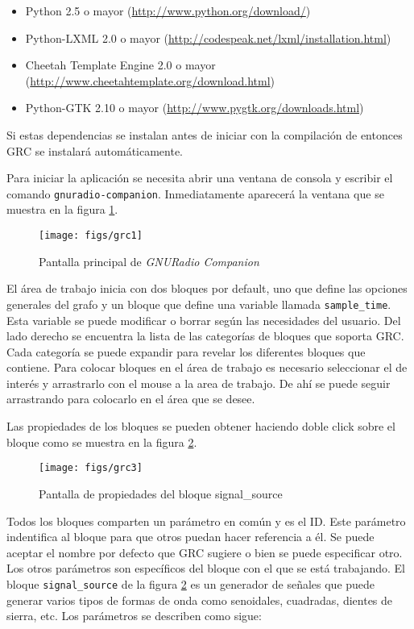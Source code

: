\begin{itemize}
  \item Python 2.5 o mayor (\url{http://www.python.org/download/})
  \item Python-LXML 2.0 o  mayor (\url{http://codespeak.net/lxml/installation.html})
  \item Cheetah Template Engine 2.0 o mayor (\url{http://www.cheetahtemplate.org/download.html})
  \item Python-GTK 2.10 o mayor (\url{http://www.pygtk.org/downloads.html})
\end{itemize}

Si estas dependencias se instalan antes de iniciar con la compilaci\'on de \gnuradio entonces GRC se
instalar\'a autom\'aticamente.

Para iniciar la aplicaci\'on se necesita abrir una ventana de consola y escribir el comando
\verb|gnuradio-companion|. Inmediatamente aparecer\'a la ventana que se muestra en la figura
\ref{fig:grc}.

\begin{figure}[tp]
  \centering
  \texttt{[image: figs/grc1]}
  \vspace{0.1in}
  \caption{Pantalla principal de \emph{GNURadio Companion}}
  \label{fig:grc}
\end{figure}

El \'area de trabajo inicia con dos bloques por default, uno que define las opciones generales del
grafo y un bloque que define una variable llamada \verb|sample_time|. Esta variable se puede
modificar o borrar seg\'un las necesidades del usuario. Del lado derecho se encuentra la lista de las
categor\'ias de bloques que soporta GRC. Cada categor\'ia se puede expandir para revelar los
diferentes bloques que contiene. Para colocar bloques en el \'area de trabajo es necesario
seleccionar el de inter\'es y arrastrarlo con el mouse a la area de trabajo. De ah\'i se puede seguir
arrastrando para colocarlo en el \'area que se desee. 

Las propiedades de los bloques se pueden obtener haciendo doble click sobre el bloque como se
muestra en la figura \ref{fig:blockprop}.

\begin{figure}[tp]
  \centering
  \texttt{[image: figs/grc3]}
  \vspace{0.1in}
  \caption{Pantalla de propiedades del bloque signal\_source}
  \label{fig:blockprop}
\end{figure}

Todos los bloques comparten un par\'ametro en com\'un y es el ID. Este par\'ametro indentifica al bloque
para que otros puedan hacer referencia a \'el. Se puede aceptar el nombre por defecto que GRC sugiere o
bien se puede especificar otro. Los otros par\'ametros son espec\'ificos del bloque con el que se est\'a
trabajando. El bloque \verb|signal_source| de la figura \ref{fig:blockprop} es un generador de
se\~nales que puede generar varios tipos de formas de onda como senoidales, cuadradas, dientes de
sierra, etc. Los par\'ametros se describen como sigue:

